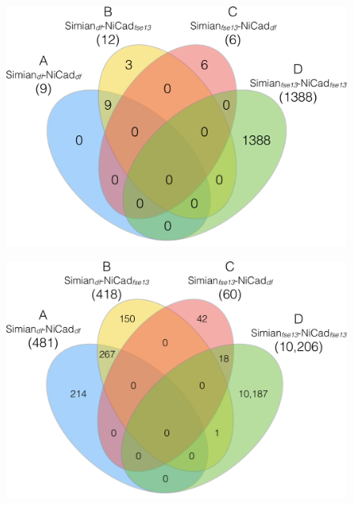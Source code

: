 \documentclass{IEEEtran}
\begin{document}
\begin{figure}
	\centering
	\begin{minipage}{.5\textwidth}
		\centering
		\includegraphics[width=0.9\linewidth]{venn4_pairs_good}
		\label{fig:venn4_orig_good}
	\end{minipage}%
	\begin{minipage}{.5\textwidth}
		\centering
		\includegraphics[width=0.9\linewidth]{venn4_pairs_ok}
		\label{fig:venn4_orig_ok}
	\end{minipage}
\end{figure}
\end{document}
